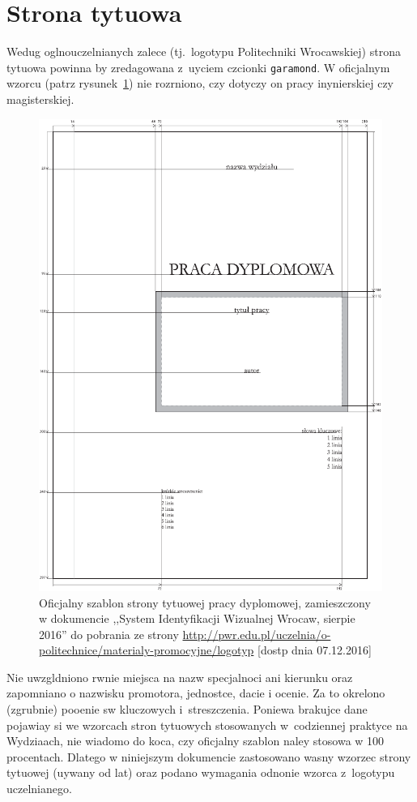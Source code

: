 \section{Strona tytuowa}
Wedug oglnouczelnianych zalece (tj.\ logotypu Politechniki Wrocawskiej) strona tytuowa powinna by zredagowana z~uyciem czcionki \texttt{garamond}. W oficjalnym wzorcu (patrz rysunek~\ref{fig:stronaTytulowa})
nie rozrniono, czy dotyczy on pracy inynierskiej czy magisterskiej. 
\begin{figure}[b]
	\centering
\includegraphics[width=.6\linewidth]{rys03/stronaTytulowa01}
	\caption{Oficjalny szablon strony tytuowej pracy dyplomowej, zamieszczony w dokumencie ,,System 
Identyfikacji Wizualnej Wrocaw, sierpie 2016'' do pobrania ze strony \url{http://pwr.edu.pl/uczelnia/o-politechnice/materialy-promocyjne/logotyp} [dostp dnia 07.12.2016]}
	\label{fig:stronaTytulowa}
\end{figure}
Nie uwzgldniono rwnie miejsca na nazw specjalnoci ani kierunku oraz zapomniano o nazwisku promotora, jednostce, dacie i ocenie.  Za to okrelono (zgrubnie) pooenie sw kluczowych i~streszczenia. Poniewa brakujce dane pojawiay si we wzorcach stron tytuowych stosowanych w~codziennej praktyce na Wydziaach, nie wiadomo do koca, czy oficjalny szablon naley stosowa w 100 procentach. Dlatego w niniejszym dokumencie zastosowano wasny wzorzec strony tytuowej (uywany od lat) oraz podano wymagania odnonie wzorca z~logotypu uczelnianego.

